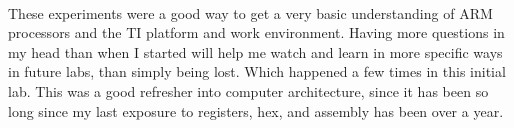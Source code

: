 \documentclass[12pt,a4paper,notitlepage]{report}
\begin{document}
\begin{normalsize}
\paragraph*{}
These experiments were a good way to get a very basic understanding of ARM processors and the TI platform and work environment. Having more questions in my head than when I started will help me watch and learn in more specific ways in future labs, than simply being lost. Which happened a few times in this initial lab. This was a good refresher into computer architecture, since it has been so long since my last exposure to registers, hex, and assembly has been over a year. 

\end{normalsize}
\end{document}
